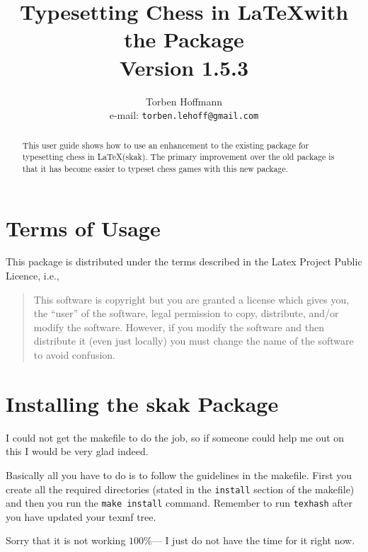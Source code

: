 \documentclass[10pt]{article}
\title{Typesetting Chess in \LaTeX with the \package{skak} Package\\
Version 1.5.3}
\author{Torben Hoffmann\\ e-mail: \texttt{torben.lehoff@gmail.com}}
\newcommand{\package}[1]{\textsf{#1}}
\begin{document}
\maketitle

\begin{abstract}
  This user guide shows how to use an enhancement to the existing
  package for typesetting chess in \LaTeX (\package{skak}). The
  primary improvement over the old package is that it has become
  easier to typeset chess games with this new package.
\end{abstract}

\newpage
\tableofcontents
\newpage



\section{Terms of Usage}
\label{sec:terms-usage}

This package is distributed under the terms described in the Latex
Project Public Licence, i.e.,

\begin{quote}
  This software is copyright but you are granted a license which gives
  you, the ``user'' of the software, legal permission to copy,
  distribute, and/or modify the software. However, if you modify the
  software and then distribute it (even just locally) you must change
  the name of the software to avoid confusion.
\end{quote}



\section{Installing the \package{skak} Package}
\label{sec:install}

I could not get the makefile to do the job, so if someone could help
me out on this I would be very glad indeed.

Basically all you have to do is to follow the guidelines in the
makefile. First you create all the required directories (stated in the
\texttt{install} section of the makefile) and then you run the
\texttt{make install} command. Remember to run \texttt{texhash} after
you have updated your texmf tree.

Sorry that it is not working $100\%$--- I just do not have the time for
it right now.
\end{document}
